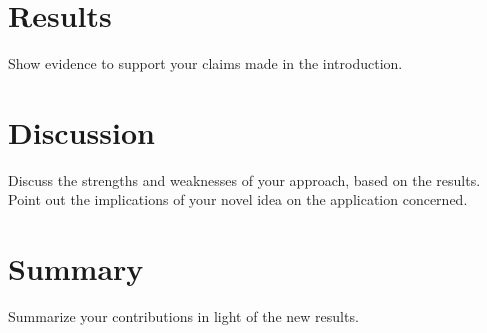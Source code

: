 \documentclass[10pt,conference,compsocconf]{IEEEtran}
\begin{document}
\section{Results}
\label{S1}
  Show evidence to support your claims made in the
introduction.
\section{Discussion}
\label{S1}
  Discuss the strengths and weaknesses of your
approach, based on the results. Point out the implications of your
novel idea on the application concerned.
\section{Summary}
\label{S1}
  Summarize your contributions in light of the new
results.
\end{document}
